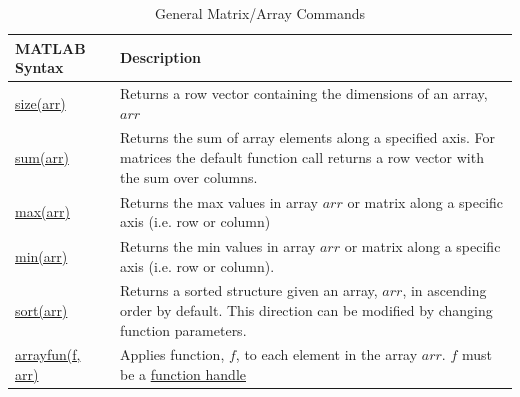 \documentclass[../MATLAB_Primer.tex]{subfiles}
\begin{document}
\begin{table}[H]
\caption{General Matrix/Array Commands}
    \begin{center}
        \begin{tabular}{| C{3cm} | m{12cm}|}
            \hline
            \textbf{MATLAB Syntax} & \textbf{Description}\\
            
            \hline
            \href{https://www.mathworks.com/help/matlab/ref/size.html}{\color{blue}size(arr)} & Returns a row vector containing the dimensions of an array, $arr$\\
            \hline
            
            \href{https://www.mathworks.com/help/matlab/ref/sum.html}{\color{blue}sum(arr)} & Returns the sum of array elements along a specified axis.  For matrices the default function call returns a row vector with the sum over columns. \\
            \hline
            
            \href{https://www.mathworks.com/help/matlab/ref/max.html}{\color{blue}max(arr)} & Returns the max values in array $arr$ or matrix along a specific axis (i.e. row or column)\\
            \hline
            
            \href{https://www.mathworks.com/help/matlab/ref/min.html}{\color{blue}min(arr)} & Returns the min values in array $arr$ or matrix along a specific axis (i.e. row or column). \\
            \hline
            
            \href{https://www.mathworks.com/help/matlab/ref/sort.html}{\color{blue}sort(arr)} & Returns a sorted structure given an array, $arr$, in ascending order by default.  This direction can be modified by changing function parameters.\\
            
            \hline
            \href{https://www.mathworks.com/help/matlab/ref/arrayfun.html}{\color{blue}arrayfun(f, arr)} & Applies function, $f$, to each element in the array $arr$.  $f$ must be a \href{https://www.mathworks.com/help/matlab/matlab_prog/creating-a-function-handle.html}{\color{blue}function handle}\\
            \hline
        \end{tabular}
        \label{tab:array_functions}
    \end{center}
\end{table}
\end{document}
